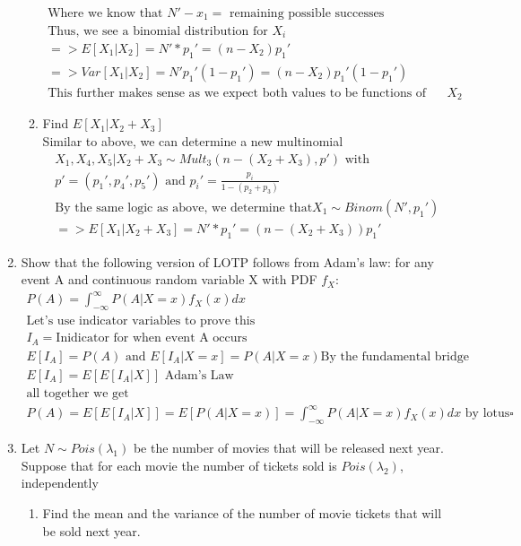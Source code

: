 \documentclass[11pt]{article}
\begin{document}
\begin{enumerate}
\begin{enumerate}
\begin{gather}
	\text{Where we know that } N'-x_1 = \text{ remaining possible successes} \\
	\text{Thus, we see a binomial distribution for }X_i\\
	=> E[X_1|X_2] = N'*p_1'= (n-X_2)p_1'\\
	=> Var[X_1|X_2] = N'p_1'(1-p_1') = (n-X_2)p_1'(1-p_1')\\
	\text{This further makes sense as we expect both values to be functions of our RV } X_2
	\end{gather}
	\item Find $E[X_1|X_2+X_3]$ 
	\\
	Similar to above, we can determine a new multinomial
	\begin{gather}
	X_1,X_4,X_5 | X_2+X_3 \sim Mult_3(n-(X_2+X_3),p') \text{ with }\\
	p'=(p_1',p_4',p_5')\text{ and } p_i'= \frac{p_i}{1-(p_2+p_3)}\\
	\text{By the same logic as above, we determine that} X_1 \sim Binom(N',p_1')\\
	=>E[X_1|X_2+X_3] = N'*p_1'= (n-(X_2+X_3))p_1'
	\end{gather}
\end{enumerate}
\item Show that the following version of LOTP follows from Adam’s law: for any event A and continuous random variable X with PDF $f_X$:
\begin{gather}
	P(A) = \int_{-\infty}^{\infty}P(A|X=x)f_X(x)dx\\
	\text{Let's use indicator variables to prove this}\\
	I_A = \text{Inidicator for when event A occurs}\\
	E[I_A] = P(A) \text{ and } E[I_A|X=x]=P(A|X=x) \text{By the fundamental bridge} \\ 
	E[I_A] = E[E[I_A|X]] \text{ Adam's Law}\\
	\text{all together we get }\\
	 P(A)= E[E[I_A|X]]=E[P(A|X=x)] = \int_{-\infty}^{\infty}P(A|X=x)f_X(x)dx \text{ by lotus}\square	
\end{gather}
\item Let $N \sim Pois(\lambda_1)$ be the number of movies that will be released next year. Suppose that for each movie the number of tickets sold is $Pois(\lambda_2)$, independently
\begin{enumerate}
	\item Find the mean and the variance of the number of movie tickets that will be sold next year.

\end{enumerate}
\end{enumerate}
\end{document}
